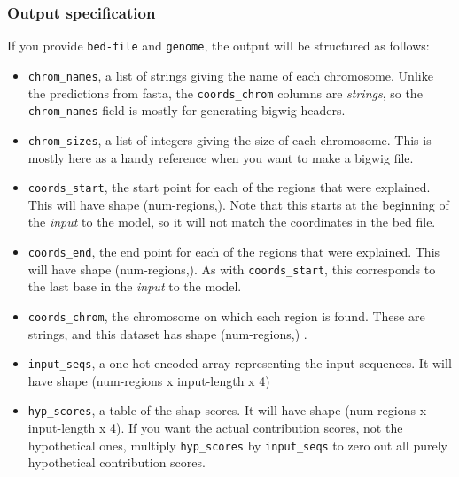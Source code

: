 \documentclass{article}
\begin{document}
\subsubsection{Output specification}

If you provide \texttt{bed-file} and \texttt{genome}, the output will be
structured as follows:

\begin{itemize}
    \item \begin{sloppypar}\texttt{chrom\_names}, a list of strings giving the
            name of each chromosome.
            Unlike the predictions from fasta, the \texttt{coords\_chrom}
            columns are \emph{strings}, so the \texttt{chrom\_names} field is
            mostly for generating bigwig headers.\end{sloppypar}
    \item \texttt{chrom\_sizes}, a list of integers giving the size of each
        chromosome.
        This is mostly here as a handy reference when you want to make a bigwig
        file.
    \item \texttt{coords\_start}, the start point for each of the regions that
        were explained.
        This will have shape (num-regions,).
        Note that this starts at the beginning of the \emph{input} to the model,
        so it will not match the coordinates in the bed file.
    \item \texttt{coords\_end}, the end point for each of the regions that were
        explained.
        This will have shape (num-regions,).
        As with \texttt{coords\_start}, this corresponds to the last base in the
        \emph{input} to the model.
    \item \texttt{coords\_chrom}, the chromosome on which each region is found.
        These are strings, and this dataset has shape (num-regions,)
        .\label{dep:interpretChroms}
    \item \texttt{input\_seqs}, a one-hot encoded array representing the input
        sequences.
        It will have shape (num-regions x input-length x 4)
    \item \texttt{hyp\_scores}, a table of the shap scores.
        It will have shape (num-regions x input-length x 4).
        If you want the actual contribution scores, not the hypothetical ones,
        multiply \texttt{hyp\_scores} by \texttt{input\_seqs} to zero out
        all purely hypothetical contribution scores.

\end{itemize}
\end{document}
